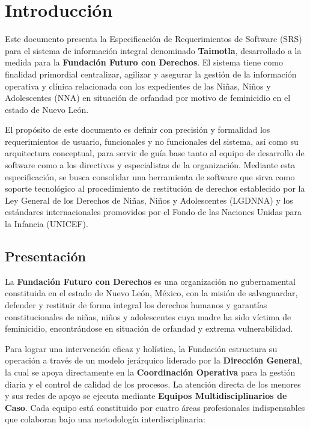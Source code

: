 \chapter{Introducción}

Este documento presenta la Especificación de Requerimientos de Software (SRS) para el sistema de información integral denominado \textbf{Taimotla}, desarrollado a la medida para la \textbf{Fundación Futuro con Derechos}. El sistema tiene como finalidad primordial centralizar, agilizar y asegurar la gestión de la información operativa y clínica relacionada con los expedientes de las Niñas, Niños y Adolescentes (NNA) en situación de orfandad por motivo de feminicidio en el estado de Nuevo León. 

El propósito de este documento es definir con precisión y formalidad los requerimientos de usuario, funcionales y no funcionales del sistema, así como su arquitectura conceptual, para servir de guía base tanto al equipo de desarrollo de software como a los directivos y especialistas de la organización. Mediante esta especificación, se busca consolidar una herramienta de software que sirva como soporte tecnológico al procedimiento de restitución de derechos establecido por la Ley General de los Derechos de Niñas, Niños y Adolescentes (LGDNNA) y los estándares internacionales promovidos por el Fondo de las Naciones Unidas para la Infancia (UNICEF).

\section{Presentación}

La \textbf{Fundación Futuro con Derechos} es una organización no gubernamental constituida en el estado de Nuevo León, México, con la misión de salvaguardar, defender y restituir de forma integral los derechos humanos y garantías constitucionales de niñas, niños y adolescentes cuya madre ha sido víctima de feminicidio, encontrándose en situación de orfandad y extrema vulnerabilidad. 

Para lograr una intervención eficaz y holística, la Fundación estructura su operación a través de un modelo jerárquico liderado por la \textbf{Dirección General}, la cual se apoya directamente en la \textbf{Coordinación Operativa} para la gestión diaria y el control de calidad de los procesos. La atención directa de los menores y sus redes de apoyo se ejecuta mediante \textbf{Equipos Multidisciplinarios de Caso}. Cada equipo está constituido por cuatro áreas profesionales indispensables que colaboran bajo una metodología interdisciplinaria:

